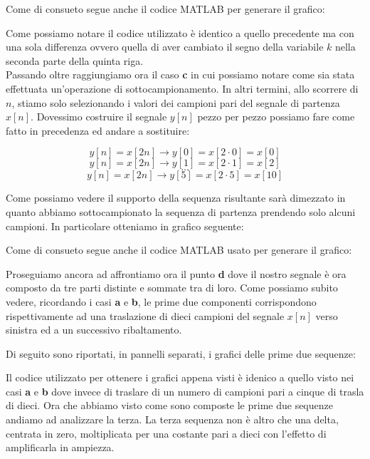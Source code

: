 \documentclass[../main.tex]{subfiles}
\begin{document}

Come di consueto segue anche il codice MATLAB per generare il grafico:



Come possiamo notare il codice utilizzato è identico a quello precedente ma con una sola differenza ovvero quella di aver cambiato il segno della variabile $k$ nella seconda parte della quinta riga.\\


Passando oltre raggiungiamo ora il caso \textbf{c} in cui possiamo notare come sia stata effettuata un'operazione di sottocampionamento. In altri termini, allo scorrere di $n$, stiamo solo selezionando i valori dei campioni pari del segnale di partenza $x[n]$. Dovessimo costruire il segnale $y[n]$ pezzo per pezzo possiamo fare come fatto in precedenza ed andare a sostituire:

\[y[n] = x[2n] \rightarrow y[0] = x[2 \cdot 0] = x[0] \]
\[y[n] = x[2n] \rightarrow y[1] = x[2 \cdot 1] = x[2] \]
\[ \dots \]
\[y[n] = x[2n] \rightarrow y[5] = x[2 \cdot 5] = x[10] \]

Come possiamo vedere il supporto della sequenza risultante sarà dimezzato in quanto abbiamo sottocampionato la sequenza di partenza prendendo solo alcuni campioni.
In particolare otteniamo in grafico seguente:


Come di consueto segue anche il codice MATLAB usato per generare il grafico:



Proseguiamo ancora ad affrontiamo ora il punto \textbf{d} dove il nostro segnale è ora composto da tre parti distinte e sommate tra di loro.
Come possiamo subito vedere, ricordando i casi \textbf{a} e \textbf{b}, le prime due componenti corrispondono rispettivamente ad una traslazione di dieci campioni del segnale $x[n]$ verso sinistra ed a un successivo ribaltamento.

Di seguito sono riportati, in pannelli separati, i grafici delle prime due sequenze:


Il codice utilizzato per ottenere i grafici appena visti è idenico a quello visto nei casi \textbf{a} e \textbf{b} dove invece di traslare di un numero di campioni pari a cinque di trasla di dieci.
Ora che abbiamo visto come sono composte le prime due sequenze andiamo ad analizzare la terza. La terza sequenza non è altro che una delta, centrata in zero, moltiplicata per una costante pari a dieci con l'effetto di amplificarla in ampiezza.
\end{document}
